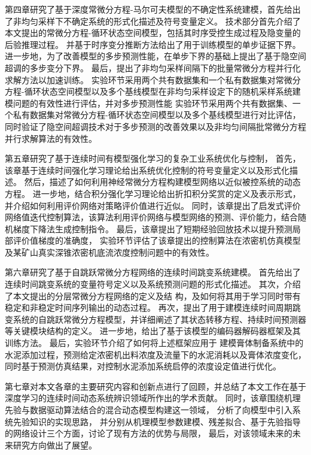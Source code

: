 第四章研究了基于深度常微分方程-马尔可夫模型的不确定性系统建模，首先给出了非均匀采样下不确定系统的形式化描述及符号变量定义。
技术部分首先介绍了本文提出的常微分方程-循环状态空间模型，包括其时序受控生成过程及隐变量的后验推理过程。
并基于时序变分推断方法给出了用于训练模型的单步证据下界。
进一步地，为了改善模型的多步预测性能，在单步下界的基础上提出了基于隐空间超调的多步变分下界。
最后，提出了非均匀采样间隔下的批量常微分方程并行化求解方法以加速训练。
实验环节采用两个共有数据集和一个私有数据集对常微分方程-循环状态空间模型以及多个基线模型在非均匀采样设定下的随机采样系统建模问题的有效性进行评估，并对多步预测性能
实验环节采用两个共有数据集、一个私有数据集对常微分方程-循环状态空间模型以及多个基线模型进行对比评估，
同时验证了隐空间超调技术对于多步预测的改善效果以及非均匀间隔批常微分方程并行求解算法的有效性。

第五章研究了基于连续时间有模型强化学习的复杂工业系统优化与控制，
首先，该章基于连续时间强化学习理论给出系统优化控制的符号变量定义以及形式化描述。
然后，描述了如何利用神经常微分方程构建模型网络以近似被控系统的动态方程。
进一步地，结合积分强化学习理论给出折扣积分奖赏的定义及表示形式，并介绍如何利用评价网络对策略评价值进行近似。
同时，该章提出了启发式评价网络值迭代控制算法，该算法利用评价网络与模型网络的预测、评价能力，结合随机梯度下降法生成控制指令。
最后，该章提出了短期经验回放技术以提升预测局部评价值梯度的准确度，
实验环节评估了该章提出的控制算法在浓密机仿真模型及某矿山真实深锥浓密机底流浓度控制问题中的有效性。

第六章研究了基于自跳跃常微分方程网络的连续时间跳变系统建模。
首先给出了连续时间跳变系统的变量符号定义以及系统预测问题的形式化描述。
其次，介绍了本文提出的分层常微分方程网络的定义及结
构，及如何将其用于学习同时带有稳定和非稳定时间序列输出的动态过程。
再次，提出了用于建模连续时间周期跳变系统的自跳跃常微分方程模型，并详细阐述了其状态转移方程、持续时间预测器等关键模块结构的定义。
进一步地，给出了基于该模型的编码器解码器框架及其训练方法。
最后，实验环节介绍了如何将上述框架应用于
建模膏体制备系统中的水泥添加过程，预测给定浓密机出料浓度及流量下的水泥消耗以及膏体浓度变化，
同时基于预测仿真结果，对控制水泥添加系统启停的浓度设定值进行优化。

第七章对本文各章的主要研究内容和创新点进行了回顾，并总结了本文工作在基于深度学习的连续时间动态系统辨识领域所作出的学术贡献。
同时，该章围绕机理先验与数据驱动算法结合的混合动态模型构建这一领域，
分析了向模型中引入系统先验知识的实现思路，
并分别从机理模型参数建模、残差拟合、基于先验指导的网络设计三个方面，讨论了现有方法的优势与局限，
最后，对该领域未来的未来研究方向做出了展望。
